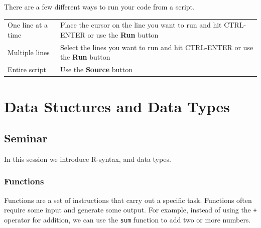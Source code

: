 \documentclass[]{article}
\begin{document}
There are a few different ways to run your code from a script.

\begin{longtable}[]{@{}ll@{}}
\toprule
\endhead
\begin{minipage}[t]{0.23\columnwidth}\raggedright
One line at a time\strut
\end{minipage} & \begin{minipage}[t]{0.71\columnwidth}\raggedright
Place the cursor on the line you want to run and hit CTRL-ENTER or use the \textbf{Run} button\strut
\end{minipage}\tabularnewline
\begin{minipage}[t]{0.23\columnwidth}\raggedright
Multiple lines\strut
\end{minipage} & \begin{minipage}[t]{0.71\columnwidth}\raggedright
Select the lines you want to run and hit CTRL-ENTER or use the \textbf{Run} button\strut
\end{minipage}\tabularnewline
\begin{minipage}[t]{0.23\columnwidth}\raggedright
Entire script\strut
\end{minipage} & \begin{minipage}[t]{0.71\columnwidth}\raggedright
Use the \textbf{Source} button\strut
\end{minipage}\tabularnewline
\bottomrule
\end{longtable}

\hypertarget{data-stuctures-and-data-types}{%
\section{Data Stuctures and Data Types}\label{data-stuctures-and-data-types}}

\hypertarget{seminar}{%
\subsection{Seminar}\label{seminar}}

In this session we introduce R-syntax, and data types.

\hypertarget{functions}{%
\subsubsection{Functions}\label{functions}}

Functions are a set of instructions that carry out a specific task. Functions often require some input and generate some output. For example, instead of using the \texttt{+} operator for addition, we can use the \texttt{sum} function to add two or more numbers.
\end{document}
